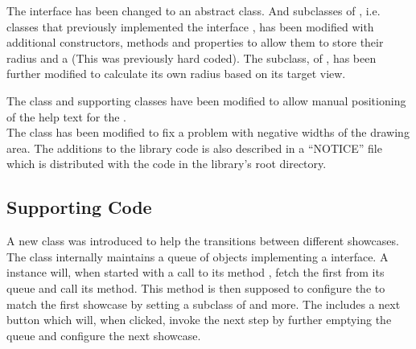 The interface  has been changed to an abstract class. And subclasses of , i.e. classes that previously implemented the interface , has been modified with additional constructors, methods and properties to allow them to store their radius and a  (This was previously hard coded). The  subclass, of , has been further modified to calculate its own radius based on its target view.  

The  class and supporting classes have been modified to allow manual positioning of the help text for the .\\ 
The  class has been modified to fix a problem with negative widths of the drawing area.
The additions to the library code is also described in a ``NOTICE'' file which is distributed with the code in the library's root directory. 

\subsection{Supporting Code}

A new class  was introduced to help the transitions between different showcases. The class internally maintains a queue of objects implementing a  interface. A  instance will, when started with a call to its method , fetch the first  from its queue and call its  method. This  method is then supposed to configure the  to match the first showcase by setting a subclass of  and more. The  includes a next button which will, when clicked, invoke the next step by further emptying the queue and configure the next showcase.





